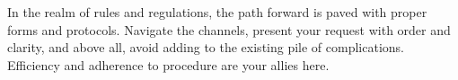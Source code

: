 \documentclass{article}
\begin{document}
\begin{infobox}
In the realm of rules and regulations, the path forward is paved with proper forms and protocols. Navigate the channels, present your request with order and clarity, and above all, avoid adding to the existing pile of complications. Efficiency and adherence to procedure are your allies here.
\end{infobox}
\end{document}
